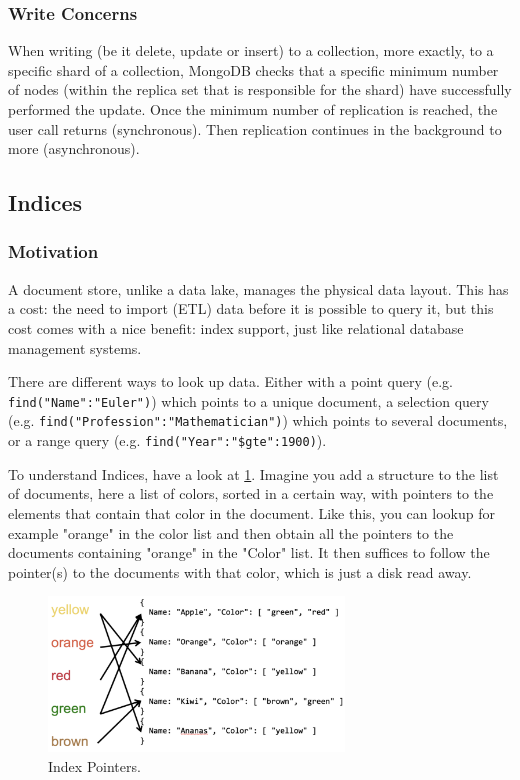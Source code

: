 \subsubsection{Write Concerns}
When writing (be it delete, update or insert) to a collection, more exactly, to a specific shard of a collection, MongoDB checks that a specific minimum number of nodes (within the replica set that is responsible for the shard) have successfully performed the update. Once the minimum number of replication is reached, the user call returns (synchronous). Then replication continues in the background to more (asynchronous).


\subsection{Indices}

\subsubsection{Motivation}
A document store, unlike a data lake, manages the physical data layout. This has a cost: the need to import (ETL) data before it is possible to query it, but this cost comes with a nice benefit: index support, just like relational database management systems.

There are different ways to look up data. Either with a point query (e.g. \texttt{find({"Name":"Euler"})}) which points to a unique document, a selection query (e.g. \texttt{find("Profession":"Mathematician")}) which points to several documents, or a range query (e.g. \texttt{find("Year":{"\$gte":1900})}).

To understand Indices, have a look at \cref{fig:Indices}. Imagine you add a structure to the list of documents, here a list of colors, sorted in a certain way, with pointers to the elements that contain that color in the document. Like this, you can lookup for example "orange" in the color list and then obtain all the pointers to the documents containing "orange" in the "Color" list. It then suffices to follow the pointer(s) to the documents with that color, which is just a disk read away.

\begin{figure}[h]
    \centering
    \includegraphics[width=0.7\textwidth]{Figures/Indices.png}
    \caption{Index Pointers.} \label{fig:Indices}
\end{figure}

